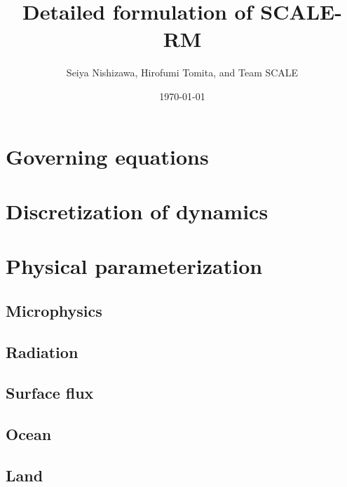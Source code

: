 \documentclass[a4paper]{report}
\title{{\LARGE Detailed formulation of SCALE-RM}}
\author{Seiya Nishizawa, Hirofumi Tomita, and Team SCALE}
\date{\today}
\begin{document}
\maketitle
\tableofcontents



\chapter{Governing equations}


\chapter{Discretization of dynamics}
\label{chap:discretization dynamics}














\chapter{Physical parameterization}



\section{Microphysics}


%


\section{Radiation}


\section{Surface flux}


\section{Ocean}


\section{Land} \label{sec:land}

\end{document}

